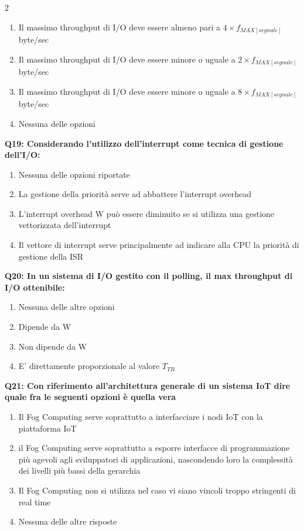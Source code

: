 \documentclass[10pt]{article}
\begin{document}
\begin{multicols}{2}
\begin{enumerate}[label=\arabic*.]
\item Il massimo throughput di I/O deve essere almeno pari a $4 \times f_{MAX[segnale]}$ byte/sec
\item Il massimo throughput di I/O deve essere minore o uguale a $2 \times f_{MAX[segnale]}$ byte/sec
\item Il massimo throughput di I/O deve essere minore o uguale a $8 \times f_{MAX[segnale]}$ byte/sec
\item Nessuna delle opzioni
\end{enumerate}
\textbf{Q19: Considerando l’utilizzo dell’interrupt come tecnica di gestione dell’I/O:}

\begin{enumerate}[label=\arabic*.]
\item Nessuna delle opzioni riportate
\item La gestione della priorità serve ad abbattere l’interrupt overhead
\item L’interrupt overhead W può essere diminuito se si utilizza una gestione vettorizzata dell’interrupt
\item Il vettore di interrupt serve principalmente ad indicare alla CPU la priorità di gestione della ISR
\end{enumerate}
\textbf{Q20: In un sistema di I/O gestito con il polling, il max throughput di I/O ottenibile:}

\begin{enumerate}[label=\arabic*.]
\item Nessuna delle altre opzioni
\item Dipende da W
\item Non dipende da W
\item E' direttamente proporzionale al valore $T_{TR}$
\end{enumerate}
\textbf{Q21: Con riferimento all’architettura generale di un sistema IoT dire quale fra le seguenti opzioni è quella vera}

\begin{enumerate}[label=\arabic*.]
\item Il Fog Computing serve soprattutto a interfacciare i nodi IoT con la piattaforma IoT
\item il Fog Computing serve soprattutto a esporre interfacce di programmazione più agevoli agli sviluppatori di applicazioni, nascondendo loro la complessità dei livelli più bassi della gerarchia
\item Il Fog Computing non si utilizza nel caso vi siano vincoli troppo stringenti di real time
\item Nessuna delle altre risposte
\end{enumerate}
\end{multicols}
\end{document}
